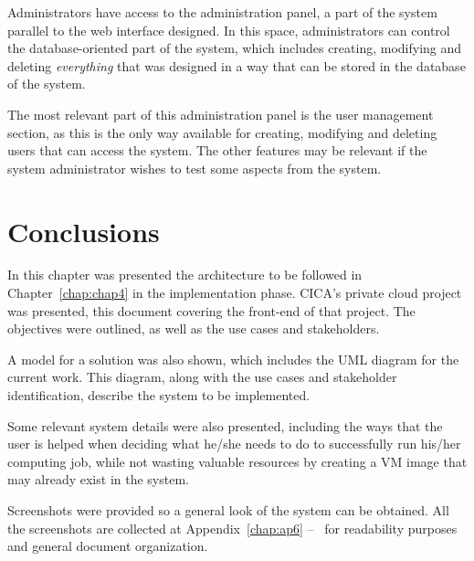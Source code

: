 Administrators have access to the administration panel, a part of the system parallel to the web interface designed. In this space, administrators can control the database-oriented part of the system, which includes creating, modifying and deleting \emph{everything} that was designed in a way that can be stored in the database of the system.

The most relevant part of this administration panel is the user management section, as this is the only way available for creating, modifying and deleting users that can access the system. The other features may be relevant if the system administrator wishes to test some aspects from the system.

\section{Conclusions}

In this chapter was presented the architecture to be followed in Chapter~\ref{chap:chap4} in the implementation phase. CICA's private cloud project was presented, this document covering the front-end of that project. The objectives were outlined, as well as the use cases and stakeholders.

A model for a solution was also shown, which includes the UML diagram for the current work. This diagram, along with the use cases and stakeholder identification, describe the system to be implemented. 

Some relevant system details were also presented, including the ways that the user is helped when deciding what he/she needs to do to successfully run his/her computing job, while not wasting valuable resources by creating a VM image that may already exist in the system.

Screenshots were provided so a general look of the system can be obtained. All the screenshots are collected at Appendix~\ref{chap:ap6} --~ for readability purposes and general document organization.
